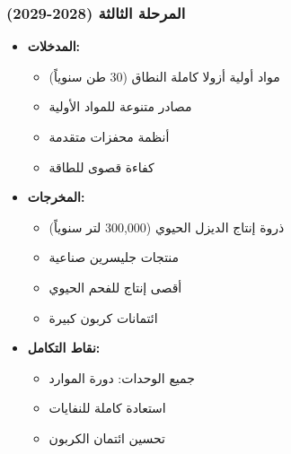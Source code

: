 \subsubsection{المرحلة الثالثة (2028-2029)}
\begin{itemize}
    \item \textbf{المدخلات:}
    \begin{itemize}
        \item مواد أولية أزولا كاملة النطاق (30 طن سنوياً)
        \item مصادر متنوعة للمواد الأولية
        \item أنظمة محفزات متقدمة
        \item كفاءة قصوى للطاقة
    \end{itemize}
    \item \textbf{المخرجات:}
    \begin{itemize}
        \item ذروة إنتاج الديزل الحيوي (300,000 لتر سنوياً)
        \item منتجات جليسرين صناعية
        \item أقصى إنتاج للفحم الحيوي
        \item ائتمانات كربون كبيرة
    \end{itemize}
    \item \textbf{نقاط التكامل:}
    \begin{itemize}
        \item جميع الوحدات: دورة الموارد
        \item استعادة كاملة للنفايات
        \item تحسين ائتمان الكربون
    \end{itemize}
\end{itemize}

